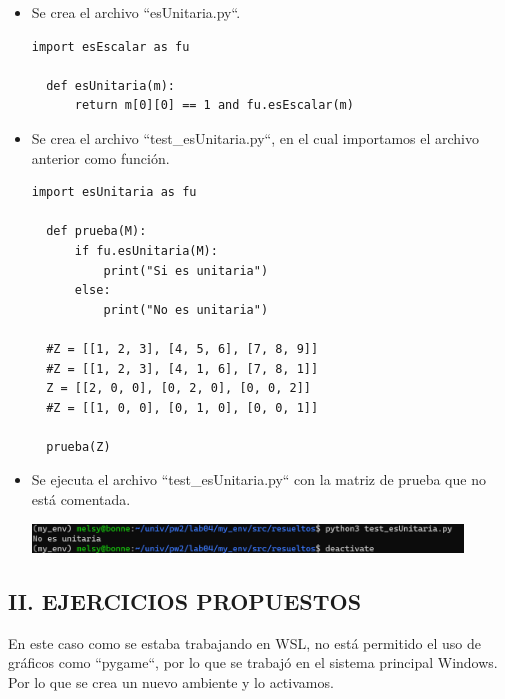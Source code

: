 \documentclass{article}
\begin{document}
  \begin{itemize}
  
  \item Se crea el archivo ``esUnitaria.py``.

  \begin{lstlisting}[style=python]
  import esEscalar as fu

  def esUnitaria(m):
      return m[0][0] == 1 and fu.esEscalar(m)
  \end{lstlisting}

    
  \item Se crea el archivo ``test\_esUnitaria.py``, en el cual importamos el archivo anterior como función.
    
  \begin{lstlisting}[style=python]
  import esUnitaria as fu

  def prueba(M):
      if fu.esUnitaria(M):
          print("Si es unitaria")
      else:
          print("No es unitaria")

  #Z = [[1, 2, 3], [4, 5, 6], [7, 8, 9]]
  #Z = [[1, 2, 3], [4, 1, 6], [7, 8, 1]]
  Z = [[2, 0, 0], [0, 2, 0], [0, 0, 2]]
  #Z = [[1, 0, 0], [0, 1, 0], [0, 0, 1]]

  prueba(Z)
  \end{lstlisting}

  \item Se ejecuta el archivo ``test\_esUnitaria.py`` con la matriz de prueba que no está comentada.

  \begin{minipage}{\linewidth}
    \centering
    \includegraphics[width=0.9\textwidth]{imagenes/r_unitaria.png}
  \end{minipage}

  \end{itemize}

\pagebreak

\subsection*{II. EJERCICIOS PROPUESTOS}

  \vspace{\baselineskip}

  En este caso como se estaba trabajando en WSL, no está permitido el uso de gráficos como ``pygame``, por lo que se trabajó en el sistema principal Windows. Por lo que se crea un nuevo ambiente y lo activamos.
  
\end{document}
